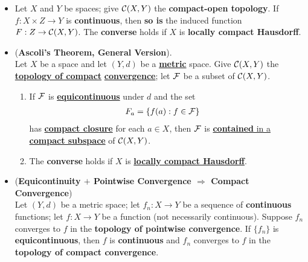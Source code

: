 \documentclass[11pt]{article}
\begin{document}
\begin{itemize}
\item \begin{proposition}
Let $X$ and $Y$ be spaces; give ${\mathcal C}(X, Y)$ the \textbf{compact-open topology}. If $f: X \times Z \rightarrow Y$ is \textbf{continuous}, then \textbf{so is} the induced function $F : Z \rightarrow {\mathcal C}(X, Y)$. The \textbf{converse} holds if $X$ is \textbf{locally compact Hausdorff}.
\end{proposition}

\item \begin{theorem} (\textbf{Ascoli's Theorem, General Version}). \citep{munkres2000topology} \\
Let $X$ be a space and let $(Y, d)$ be a \underline{\textbf{metric}} space. Give ${\mathcal C}(X, Y)$ the \underline{\textbf{topology of compact}} \underline{\textbf{convergence}}; let ${\mathcal F}$ be a subset of ${\mathcal C}(X, Y)$.
\begin{enumerate}
\item If ${\mathcal F}$ is \underline{\textbf{equicontinuous}} under $d$ and the set
\begin{align*}
F_{a} &= \left\{f(a): f \in {\mathcal F}\right\}
\end{align*}
has \underline{\textbf{compact closure}} for each $a \in X$, then ${\mathcal F}$ is \underline{\textbf{contained} in a \textbf{compact subspace}} of ${\mathcal C}(X, Y)$.
\item  The \textbf{converse} holds if $X$ is \underline{\textbf{locally compact Hausdorff}}.
\end{enumerate}
\end{theorem}


\item \begin{proposition} (\textbf{Equicontinuity $+$ Pointwise Convergence $\Rightarrow$ Compact Convergence}) \citep{munkres2000topology}\\
Let $(Y, d)$ be a metric space; let $f_n : X \rightarrow Y$ be a sequence of \textbf{continuous} functions; let $f : X \rightarrow Y$ be a function (not necessarily continuous). Suppose $f_n$ converges to $f$ in the \textbf{topology of pointwise convergence}. If $\{f_n\}$ is \textbf{equicontinuous}, then $f$ is \textbf{continuous} and $f_n$ converges to $f$ in the \textbf{topology of compact convergence}.
\end{proposition}
\end{itemize}
\end{document}
